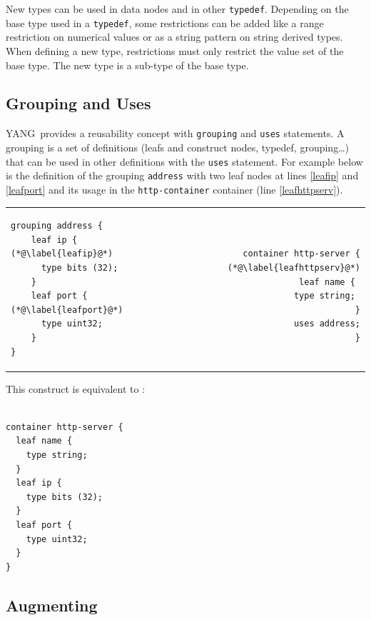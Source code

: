 \documentclass[a4paper]{article}
\newcommand{\y}{YANG}
\begin{document}
New  types can  be used  in  data nodes  and in  other {\tt  typedef}.
Depending on the base type  used in a {\tt typedef}, some restrictions
can be  added like  a range  restriction on numerical  values or  as a
string  pattern on  string derived  types. When  defining a  new type,
restrictions must  only restrict the value  set of the  base type. The
new type is a sub-type of the base type.

\subsection{Grouping and Uses}

\y\ provides a reusability concept  with {\tt grouping} and {\tt uses}
statements. A  grouping is a  set of definitions (leafs  and construct
nodes, typedef, grouping\ldots) that  can be used in other definitions
with the {\tt uses} statement.  For example below is the definition of
the grouping {\tt  address} with two leaf nodes  at lines \ref{leafip}
and  \ref{leafport}   and  its  usage  in   the  {\tt  http-container}
container (line \ref{leafhttpserv}).

\noindent
\begin{tabular}{lr}
\begin{minipage}{.5\textwidth}
\begin{lstlisting}[name=grouping]
grouping address {
    leaf ip { (*@\label{leafip}@*)
      type bits (32);
    }
    leaf port {  (*@\label{leafport}@*)
      type uint32;
    }
}
\end{lstlisting}
\end{minipage}
&
\begin{minipage}{.5\textwidth}
\begin{lstlisting}[name=grouping]

container http-server { (*@\label{leafhttpserv}@*)
  leaf name { 
    type string; 
  }
  uses address;
}
\end{lstlisting}
\end{minipage}
\end{tabular}

This construct is equivalent to :

\noindent
\begin{lstlisting}

container http-server {
  leaf name { 
    type string; 
  }
  leaf ip {
    type bits (32);
  }
  leaf port {
    type uint32;
  }
}
\end{lstlisting}

\subsection{Augmenting}
\end{document}
